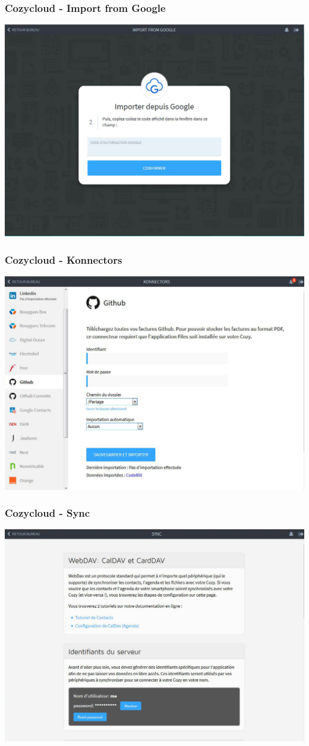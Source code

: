 \documentclass{beamer}
\begin{document}
\begin{frame}
\frametitle{Cozycloud - Import from Google}
\includegraphics[scale=0.3] {./CozyCloud/CozyCloud_Import_From_Google.jpg}
\end{frame}
\begin{frame}
\frametitle{Cozycloud - Konnectors}
\includegraphics[scale=0.3] {./CozyCloud/CozyCloud_Konnectors.jpg}
\end{frame}

\begin{frame}
\frametitle{Cozycloud - Sync}
\includegraphics[scale=0.3] {./CozyCloud/CozyCloud_Sync.jpg}
\end{frame}
\end{document}
